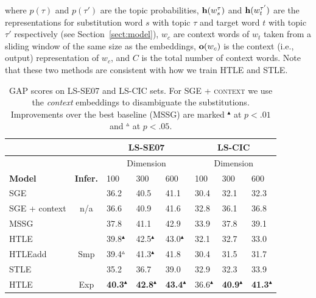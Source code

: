 \noindent where $p(\tau)$ and $p(\tau')$ are the topic probabilities, $\bm{\mathbf{h}}(w_s^\tau)$ and $\bm{\mathbf{h}}(w_t^{\tau'})$ are the representations for substitution word $s$ with topic $\tau$ and target word $t$ with topic $\tau'$ respectively (see Section~\ref{sect:model}),
$w_c$ are context words of $w_t$ taken from a sliding window of the same size as the embeddings,
$\bm{\mathbf{o}}(w_c)$ is the context (i.e., output) representation of $w_c$, and $C$ is the total number of context words.
Note that these two methods are consistent with how we train HTLE and STLE.
%
\begin{table}[bht!]
\centering
\small
\setlength{\tabcolsep}{8pt}
\caption{\label{embs_tables00}GAP scores on LS-SE07 and LS-CIC sets. For \textsc{SGE + context} we use the \textit{context} embeddings to disambiguate the substitutions. Improvements over the best baseline (MSSG) are marked $^\blacktriangle$ at $p<.01$ and $^\vartriangle$ at $p < .05$.} 
\begin{tabular}{@{\extracolsep{4pt}}lcllllll@{}}
\toprule
                           && \multicolumn{3}{c}{\textbf{LS-SE07}}  & \multicolumn{3}{c}{\textbf{LS-CIC}} \\ 
                           \midrule
                                                      && \multicolumn{3}{c}{Dimension} &  \multicolumn{3}{c}{Dimension}   \\ 
                                                      \cmidrule{3-5}  \cmidrule{6-8}
              \textbf{Model}      & \textbf{Infer.}       & 100         & 300         & 600       & 100         & 300         & 600     \\ \midrule
SGE  &   \multirow{3}{*}{n/a}  & 36.2          &      40.5       &      41.1   &      30.4     &       32.1      &       32.3       \\
SGE + context  &  &      36.6       &       40.9      &     41.6   &  32.8      &    36.1         &      36.8         \\
MSSG & & 37.8 & 41.1 & 42.9 & 33.9 & 37.8 &  39.1 \\
\midrule
HTLE    & \multirow{3}{*}{Smp} & 39.8$^\blacktriangle$   & 42.5$^\blacktriangle$  &   43.0$^\blacktriangle$  & 32.1 & 32.7 &  33.0   \\
HTLEadd  &   & 39.4$^\vartriangle$   & 41.3$^\blacktriangle$  &   41.8  & 30.4 & 31.5 &    31.7   \\
STLE     &   & 35.2  & 36.7 & 39.0    & 32.9 & 32.3 &  33.9  \\ 
\midrule
HTLE      &  \multirow{3}{*}{Exp}   &     \textbf{40.3}$^\blacktriangle$       &      \textbf{42.8}$^\blacktriangle$       &      \textbf{43.4}$^\blacktriangle$     &     36.6$^\blacktriangle$       &      \textbf{40.9}$^\blacktriangle$        &      \textbf{41.3}$^\blacktriangle$      \\

\end{tabular}
\end{table}
